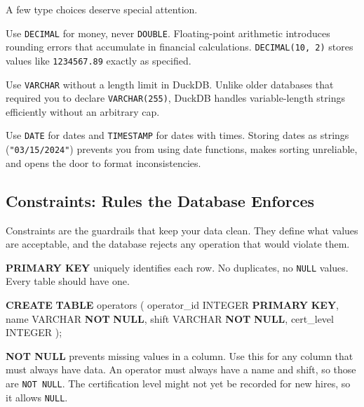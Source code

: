 \documentclass[
  letterpaper,
  DIV=11,
  numbers=noendperiod]{scrreprt}
\newenvironment{Shaded}{\begin{snugshade}}{\end{snugshade}}
\newcommand{\DataTypeTok}[1]{\textcolor[rgb]{0.68,0.00,0.00}{#1}}
\newcommand{\KeywordTok}[1]{\textcolor[rgb]{0.00,0.23,0.31}{\textbf{#1}}}
\newcommand{\NormalTok}[1]{\textcolor[rgb]{0.00,0.23,0.31}{#1}}
\begin{document}
A few type choices deserve special attention.

Use \texttt{DECIMAL} for money, never \texttt{DOUBLE}. Floating-point
arithmetic introduces rounding errors that accumulate in financial
calculations. \texttt{DECIMAL(10,\ 2)} stores values like
\texttt{1234567.89} exactly as specified.

Use \texttt{VARCHAR} without a length limit in DuckDB. Unlike older
databases that required you to declare \texttt{VARCHAR(255)}, DuckDB
handles variable-length strings efficiently without an arbitrary cap.

Use \texttt{DATE} for dates and \texttt{TIMESTAMP} for dates with times.
Storing dates as strings (\texttt{"03/15/2024"}) prevents you from using
date functions, makes sorting unreliable, and opens the door to format
inconsistencies.

\subsection{Constraints: Rules the Database
Enforces}\label{constraints-rules-the-database-enforces}

Constraints are the guardrails that keep your data clean. They define
what values are acceptable, and the database rejects any operation that
would violate them.

\textbf{PRIMARY KEY} uniquely identifies each row. No duplicates, no
\texttt{NULL} values. Every table should have one.

\begin{codelisting}

\caption{\texttt{duckdb}}

\begin{Shaded}
\begin{Highlighting}[]
\KeywordTok{CREATE} \KeywordTok{TABLE}\NormalTok{ operators (}
\NormalTok{    operator\_id }\DataTypeTok{INTEGER} \KeywordTok{PRIMARY} \KeywordTok{KEY}\NormalTok{,}
\NormalTok{    name        }\DataTypeTok{VARCHAR} \KeywordTok{NOT} \KeywordTok{NULL}\NormalTok{,}
\NormalTok{    shift       }\DataTypeTok{VARCHAR} \KeywordTok{NOT} \KeywordTok{NULL}\NormalTok{,}
\NormalTok{    cert\_level  }\DataTypeTok{INTEGER}
\NormalTok{);}
\end{Highlighting}
\end{Shaded}

\end{codelisting}

\textbf{NOT NULL} prevents missing values in a column. Use this for any
column that must always have data. An operator must always have a name
and shift, so those are \texttt{NOT\ NULL}. The certification level
might not yet be recorded for new hires, so it allows \texttt{NULL}.
\end{document}
